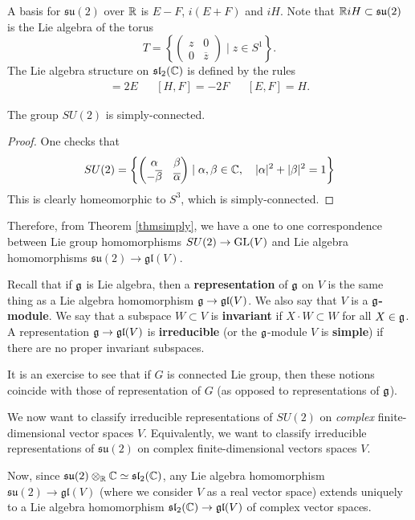 \documentclass[11pt, english]{article}
\begin{document}
A basis for $\mathfrak{su}(2)$ over $\mathbb{R}$ is $E-F$, $i(E+F)$ and $iH$. Note that $\mathbb{R} i H \subset \mathfrak{su}(2)$ is the Lie algebra of the torus 
$$
T = \left\{ \begin{pmatrix}
z & 0 \\
0 & \overline z 
\end{pmatrix} \mid z \in S^1
\right\}.
$$
The Lie algebra structure on $\mathfrak{sl}_2(\mathbb{C})$ is defined by the rules
\begin{align*}
[H,E] = 2E && [H,F] = -2F && [E,F] = H.
\end{align*}

\begin{lemma}
The group $SU(2)$ is simply-connected.
\end{lemma}
\begin{proof}
One checks that
$$
SU(2) =\left\{ \begin{pmatrix}
\alpha & \beta \\
-\overline \beta & \overline \alpha 
\end{pmatrix}
\mid \alpha, \beta \in \mathbb{C}, \quad |\alpha|^2 + |\beta|^2 = 1
\right\}
$$
This is clearly homeomorphic to $S^3$, which is simply-connected.
\end{proof}

Therefore, from Theorem \ref{thmsimply}, we have a one to one correspondence between Lie group homomorphisms $SU(2) \to \operatorname{GL}(V)$ and Lie algebra homomorphisms $\mathfrak{su}(2) \to \mathfrak{gl}(V)$.

Recall that if $\mathfrak g$ is Lie algebra, then a \textbf{representation} of $\mathfrak g$ on $V$ is the same thing as a Lie algebra homomorphism $\mathfrak g \to \mathfrak{gl}(V)$. We also say that $V$ is a \textbf{$\mathfrak g$-module}. We say that a subspace $W \subset V$ is \textbf{invariant} if $X \cdot W \subset W$ for all $X \in \mathfrak g$. A representation $\mathfrak g \to \mathfrak{gl}(V)$ is \textbf{irreducible} (or the $\mathfrak g$-module $V$ is \textbf{simple}) if there are no proper invariant subspaces.

It is an exercise to see that if $G$ is connected Lie group, then these notions coincide with those of representation of $G$ (as opposed to representations of $\mathfrak g$).

We now want to classify irreducible representations of $SU(2)$ on \emph{complex} finite-dimensional vector spaces $V$. Equivalently, we want to classify irreducible representations of $\mathfrak{su}(2)$ on complex finite-dimensional vectors spaces $V$. 

Now, since $\mathfrak{su}(2) \otimes_{\mathbb{R}} \mathbb{C} \simeq \mathfrak{sl}_2(\mathbb{C})$, any Lie algebra homomorphism $\mathfrak{su}(2) \to \mathfrak{gl}(V)$ (where we consider $V$ as a real vector space) extends uniquely to a Lie algebra homomorphism $\mathfrak{sl}_2(\mathbb{C}) \to \mathfrak{gl}(V)$ of complex vector spaces.
\end{document}
